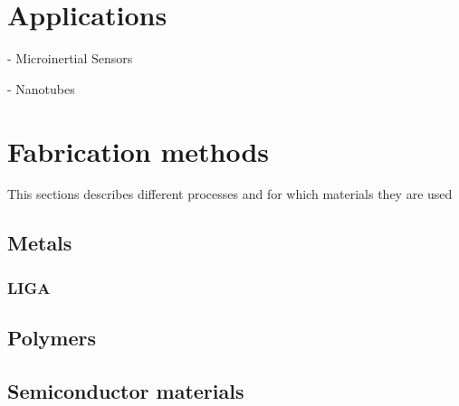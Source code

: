 \documentclass[a4paper,
  twoside, %
  headlines=2.1 %
  ]{scrartcl}
\begin{document}
\section{Applications}
- Microinertial Sensors

- Nanotubes

\section{Fabrication methods}
This sections describes different processes and for which materials they are used

\subsection{Metals}
\subsubsection{LIGA}
\cite{BECKER198635}

\subsection{Polymers}

\subsection{Semiconductor materials}
\end{document}
